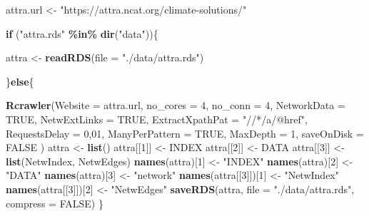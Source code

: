 \documentclass[
]{article}
\newenvironment{Shaded}{\begin{snugshade}}{\end{snugshade}}
\newcommand{\AttributeTok}[1]{\textcolor[rgb]{0.13,0.29,0.53}{#1}}
\newcommand{\ConstantTok}[1]{\textcolor[rgb]{0.56,0.35,0.01}{#1}}
\newcommand{\ControlFlowTok}[1]{\textcolor[rgb]{0.13,0.29,0.53}{\textbf{#1}}}
\newcommand{\DecValTok}[1]{\textcolor[rgb]{0.00,0.00,0.81}{#1}}
\newcommand{\FunctionTok}[1]{\textcolor[rgb]{0.13,0.29,0.53}{\textbf{#1}}}
\newcommand{\NormalTok}[1]{#1}
\newcommand{\OtherTok}[1]{\textcolor[rgb]{0.56,0.35,0.01}{#1}}
\newcommand{\SpecialCharTok}[1]{\textcolor[rgb]{0.81,0.36,0.00}{\textbf{#1}}}
\newcommand{\StringTok}[1]{\textcolor[rgb]{0.31,0.60,0.02}{#1}}
\begin{document}
\begin{Shaded}
\begin{Highlighting}[]
\NormalTok{attra.url }\OtherTok{\textless{}{-}} \StringTok{"https://attra.ncat.org/climate{-}solutions/"}

\ControlFlowTok{if}\NormalTok{ (}\StringTok{"attra.rds"} \SpecialCharTok{\%in\%} \FunctionTok{dir}\NormalTok{(}\StringTok{"data"}\NormalTok{))\{}

\NormalTok{    attra }\OtherTok{\textless{}{-}} \FunctionTok{readRDS}\NormalTok{(}\AttributeTok{file =} \StringTok{"./data/attra.rds"}\NormalTok{)}

\NormalTok{\}}\ControlFlowTok{else}\NormalTok{\{}

    \FunctionTok{Rcrawler}\NormalTok{(}\AttributeTok{Website =}\NormalTok{ attra.url,}
             \AttributeTok{no\_cores =} \DecValTok{4}\NormalTok{, }\AttributeTok{no\_conn =} \DecValTok{4}\NormalTok{, }
             \AttributeTok{NetworkData =} \ConstantTok{TRUE}\NormalTok{,}
             \AttributeTok{NetwExtLinks =} \ConstantTok{TRUE}\NormalTok{, }
             \AttributeTok{ExtractXpathPat =} \StringTok{"//*/a/@href"}\NormalTok{,}
             \AttributeTok{RequestsDelay =} \DecValTok{0}\NormalTok{,}\DecValTok{01}\NormalTok{,}
             \AttributeTok{ManyPerPattern =} \ConstantTok{TRUE}\NormalTok{, }\AttributeTok{MaxDepth =} \DecValTok{1}\NormalTok{, }
             \AttributeTok{saveOnDisk =} \ConstantTok{FALSE}
\NormalTok{             )}
\NormalTok{    attra }\OtherTok{\textless{}{-}} \FunctionTok{list}\NormalTok{()}
\NormalTok{    attra[[}\DecValTok{1}\NormalTok{]] }\OtherTok{\textless{}{-}}\NormalTok{ INDEX}
\NormalTok{    attra[[}\DecValTok{2}\NormalTok{]] }\OtherTok{\textless{}{-}}\NormalTok{ DATA}
\NormalTok{    attra[[}\DecValTok{3}\NormalTok{]] }\OtherTok{\textless{}{-}} \FunctionTok{list}\NormalTok{(NetwIndex, NetwEdges)}
    \FunctionTok{names}\NormalTok{(attra)[}\DecValTok{1}\NormalTok{] }\OtherTok{\textless{}{-}} \StringTok{"INDEX"}
    \FunctionTok{names}\NormalTok{(attra)[}\DecValTok{2}\NormalTok{] }\OtherTok{\textless{}{-}} \StringTok{"DATA"}
    \FunctionTok{names}\NormalTok{(attra)[}\DecValTok{3}\NormalTok{] }\OtherTok{\textless{}{-}} \StringTok{"network"}
    \FunctionTok{names}\NormalTok{(attra[[}\DecValTok{3}\NormalTok{]])[}\DecValTok{1}\NormalTok{] }\OtherTok{\textless{}{-}} \StringTok{"NetwIndex"}
    \FunctionTok{names}\NormalTok{(attra[[}\DecValTok{3}\NormalTok{]])[}\DecValTok{2}\NormalTok{] }\OtherTok{\textless{}{-}} \StringTok{"NetwEdges"}
    \FunctionTok{saveRDS}\NormalTok{(attra, }\AttributeTok{file =} \StringTok{"./data/attra.rds"}\NormalTok{, }\AttributeTok{compress =} \ConstantTok{FALSE}\NormalTok{)}
\NormalTok{\}}
\end{Highlighting}
\end{Shaded}
\end{document}

